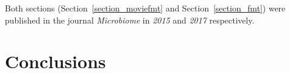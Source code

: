 \documentclass[12pt,chapterheads]{ucsd}
\begin{document}
Both sections (Section~\ref{section_moviefmt} and Section~\ref{section_fmt}) 
were published in the journal \textsl{Microbiome} in \textsl{2015} and 
\textsl{2017} respectively.




\chapter{Conclusions}






\printindex %


\end{document}
